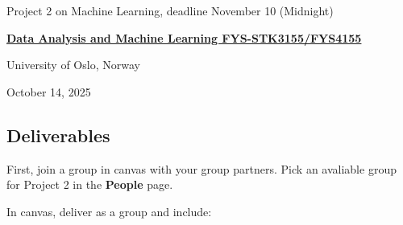 \documentclass[%
oneside,                 %
final,                   %
10pt]{article}
\begin{document}

\newcommand{\exercisesection}[1]{\subsection*{#1}}






\thispagestyle{empty}

\begin{center}
{\LARGE\bf
\begin{spacing}{1.25}
Project 2 on Machine Learning, deadline November 10 (Midnight)
\end{spacing}
}
\end{center}


\begin{center}
{\bf \href{{http://www.uio.no/studier/emner/matnat/fys/FYS3155/index-eng.html}}{Data Analysis and Machine Learning FYS-STK3155/FYS4155}}
\end{center}

    \begin{center}
\centerline{{\small University of Oslo, Norway}}
\end{center}
    

\begin{center}
October 14, 2025
\end{center}

\vspace{1cm}


\subsection*{Deliverables}

First, join a group in canvas with your group partners. Pick an avaliable group for Project 2 in the \textbf{People} page.

In canvas, deliver as a group and include:
\end{document}
